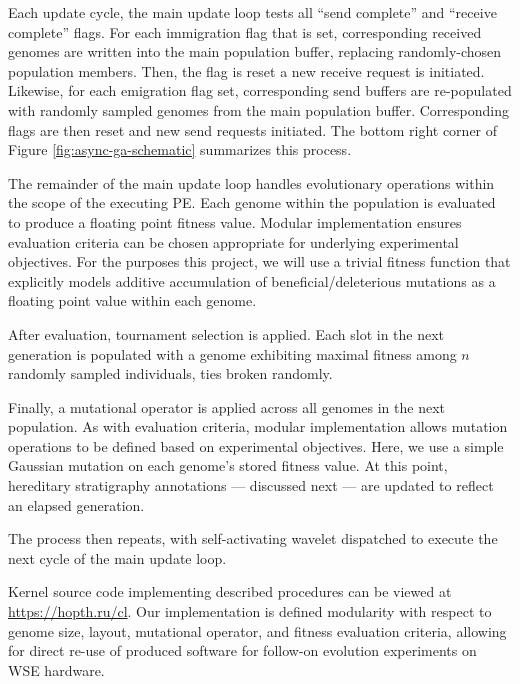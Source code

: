 Each update cycle, the main update loop tests all ``send complete'' and ``receive complete'' flags.
For each immigration flag that is set, corresponding received genomes are written into the main population buffer, replacing randomly-chosen population members.
Then, the flag is reset a new receive request is initiated.
Likewise, for each emigration flag set, corresponding send buffers are re-populated with randomly sampled genomes from the main population buffer.
Corresponding flags are then reset and new send requests initiated.
The bottom right corner of Figure \ref{fig:async-ga-schematic} summarizes this process.

The remainder of the main update loop handles evolutionary operations within the scope of the executing PE.
Each genome within the population is evaluated to produce a floating point fitness value.
Modular implementation ensures evaluation criteria can be chosen appropriate for underlying experimental objectives.
For the purposes this project, we will use a trivial fitness function that explicitly models additive accumulation of beneficial/deleterious mutations as a floating point value within each genome.

After evaluation, tournament selection is applied.
Each slot in the next generation is populated with a genome exhibiting maximal fitness among $n$ randomly sampled individuals, ties broken randomly.

Finally, a mutational operator is applied across all genomes in the next population.
As with evaluation criteria, modular implementation allows mutation operations to be defined based on experimental objectives.
Here, we use a simple Gaussian mutation on each genome's stored fitness value.
At this point, hereditary stratigraphy annotations --- discussed next --- are updated to reflect an elapsed generation.

The process then repeats, with self-activating wavelet dispatched to execute the next cycle of the main update loop.

Kernel source code implementing described procedures can be viewed at \url{https://hopth.ru/cl}.
Our implementation is defined modularity with respect to genome size, layout, mutational operator, and fitness evaluation criteria, allowing for direct re-use of produced software for follow-on evolution experiments on WSE hardware.


